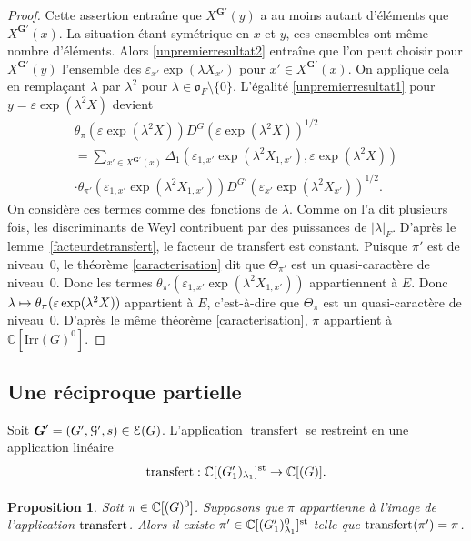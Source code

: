 \documentclass[11pt]{article}
\numberwithin{equation}{section}\providecommand{\og}{«\,}\providecommand{\fg}{\,»}
\let\mathcal \EuScript
\newcommand{\NoChangel}[1]{%
\expandafter\let\csname old\string#1\endcsname=#1
\let#1=\relax
\newcommand{#1}{\mathcode`l="716C\csname old\string#1\endcsname\mathcode`l="7160 }%
}
\let\epsilon\varepsilon
\newcommand\mto{\mathchoice{\longmapsto}{\mapsto}{\mapsto}{\mapsto}}
\newcommand{\fro}{\mathfrak{o}}
\newcommand{\rell}{\mathrm{ell}} \NoChangel{\rell}
\newcommand{\Ell}{\mathrm{Ell}} \NoChangel{\Ell}
\newcommand{\Irr}{\mathrm{Irr}}
\newcommand{\st}{\mathrm{st}}
\DeclareMathOperator{\transfert}{transfert}
\newcommand{\bG}{\boldsymbol{G}}
\newcommand{\cE}{\mathcal{E}}
\newcommand{\cG}{\mathcal{G}}
\newcommand{\CC}{\mathbb{C}}
\theoremstyle{plain}
\newtheorem*{prop*}{Proposition}
\theoremstyle{definition}
\begin{document}
\begin{proof}
Cette assertion entraîne que $X^{\bG'}(y)$ a au moins autant d'éléments que $X^{\bG'}(x)$. La situation étant symétrique en $x$ et $y$, ces ensembles ont même nombre d'éléments. Alors \eqref{unpremierresultat2} entraîne que l'on peut choisir pour $X^{\bG'}(y)$ l'ensemble des $\epsilon_{x'}\exp(\lambda X_{x'})$ pour $x'\in X^{\bG'}(x)$. On applique cela en remplaçant $\lambda$ par $\lambda^2$ pour $\lambda\in \fro_{F}\setminus\{0\}$. L'égalité \eqref{unpremierresultat1} pour $y=\epsilon \exp(\lambda^2 X)$ devient
\begin{multline*}\tag{3}\label{unpremierresultat3}
\theta_{\pi}(\epsilon \exp(\lambda^2X))D^G(\epsilon \exp(\lambda^2 X))^{1/2}\\[-3pt]
=\sum_{x'\in X^{\bG'}(x)}\Delta_{1}(\epsilon_{1,x'}\exp(\lambda^2X_{1,x'}),\epsilon \exp(\lambda^2X))
\\[-10pt]
\cdot\theta_{\pi'}(\epsilon_{1,x'}\exp(\lambda^2X_{1,x'}))D^{G'}(\epsilon_{x'}\exp(\lambda^2X_{x'}))^{1/2}.
\end{multline*}
On considère ces termes comme des fonctions de $\lambda$. Comme on l'a dit plusieurs fois, les discriminants de Weyl contribuent par des puissances de $\vert \lambda\vert _{F}$. D'après le lemme~\ref{facteurdetransfert}, le facteur de transfert est constant. Puisque $\pi'$ est de niveau~$0$, le théorème \ref{caracterisation} dit que $\Theta_{\pi'}$ est un quasi-caractère de niveau~$0$. Donc les termes $\theta_{\pi'}(\epsilon_{1,x'}\exp(\lambda^2X_{1,x'}))$ appartiennent à $E$. Donc $\lambda\mto \theta_{\pi}(\epsilon \exp(\lambda^2X))$ appartient à $E$, c'est-à-dire que $\Theta_{\pi}$ est un quasi-caractère de niveau~$0$. D'après le même théorème \ref{caracterisation}, $\pi$ appartient à $\CC[\Irr(G)^0]$.
\end{proof}

\subsection{Une réciproque partielle}\label{unereciproque}
Soit $\bG'=(G',\cG',s)\in \cE(G)$.
L'application $\transfert$ se restreint en une application linéaire
\[
\transfert_{\rell}:\CC[\Ell(G'_{1})_{\lambda_{1}}]^{\st}\to \CC[\Ell(G)].
\]
\begin{prop*}
Soit $\pi\in \CC[\Ell(G)^0]$. Supposons que $\pi$ appartienne à l'image de l'application $\transfert_{\rell}$. Alors il existe $\pi'\in \CC[\Ell(G'_{1})^0_{\lambda_{1}}]^{\st}$ telle que $\transfert_{\rell}(\pi')=\pi$.
\end{prop*}
\end{document}
